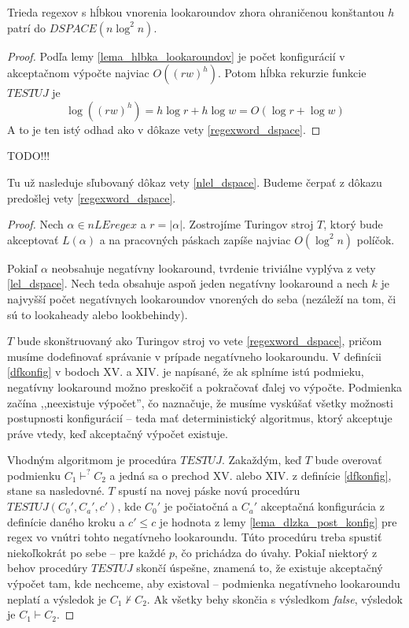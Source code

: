 \documentclass{svk_long_sk}
\def\nle{nLEregex}
\def\todo{{\color{red} TODO!!!}}
\begin{document}
\begin{corollary}
Trieda regexov s hĺbkou vnorenia look\-aroundov zhora ohraničenou konštantou $h$ patrí do $DSPACE(n\log^2 n)$.
\end{corollary}
\begin{proof}
Podľa lemy \ref{lema_hlbka_lookaroundov} je počet konfigurácií v akceptačnom výpočte najviac $O((rw)^h)$. Potom hĺbka rekurzie funkcie $TESTUJ$ je 
$$\log((rw)^h) = h\log r + h\log w = O(\log r+\log w)$$ 
A to je ten istý odhad ako v dôkaze vety \ref{regexword_dspace}.
\end{proof}
\todo

Tu už nasleduje sľubovaný dôkaz vety \ref{nlel_dspace}. Budeme čerpať z dôkazu predošlej vety \ref{regexword_dspace}.
\begin{proof}
Nech $\alpha\in\nle$ a $r=|\alpha|$. Zostrojíme Turingov stroj $T$, ktorý bude akceptovať $L(\alpha)$ a na pracovných páskach zapíše najviac $O(\log^2 n)$ políčok.

Pokiaľ $\alpha$ neobsahuje negatívny lookaround, tvrdenie triviálne vyplýva z vety \ref{lel_dspace}. Nech teda obsahuje aspoň jeden negatívny lookaround a nech $k$ je najvyšší počet negatívnych lookaroundov vnorených do seba (nezáleží na tom, či sú to lookaheady alebo look\-behindy).

$T$ bude skonštruovaný ako Turingov stroj vo vete \ref{regexword_dspace}, pričom musíme dodefinovať správanie v prípade negatívneho lookaroundu. V definícii \ref{dfkonfig} v bodoch XV. a XIV. je napísané, že ak splníme istú podmieku, negatívny lookaround možno preskočiť a pokračovať ďalej vo výpočte. Podmienka začína ,,neexistuje výpočet'', čo naznačuje, že musíme vyskúšať všetky možnosti postupnosti konfigurácií -- teda mať deterministický algoritmus, ktorý akceptuje práve vtedy, keď akceptačný výpočet existuje.

Vhodným algoritmom je procedúra $TESTUJ$. Zakaždým, keď $T$ bude overovať podmienku $C_1\mathop{\vdash}^? C_2$ a jedná sa o prechod XV. alebo XIV. z definície \ref{dfkonfig}, stane sa nasledovné. $T$ spustí na novej páske novú procedúru $TESTUJ(C_0',C_a',c')$, kde $C_0'$ je počiatočná a $C_a'$ akceptačná konfigurácia z definície daného kroku a $c' \leq c$ je hodnota z lemy \ref{lema_dlzka_post_konfig} pre regex vo vnútri tohto negatívneho lookaroundu. Túto procedúru treba spustiť niekoľkokrát po sebe -- pre každé $p$, čo prichádza do úvahy. Pokiaľ niektorý z behov procedúry $TESTUJ$ skončí úspešne, znamená to, že existuje akceptačný výpočet tam, kde nechceme, aby existoval -- podmienka negatívneho lookaroundu neplatí a výsledok je $C_1\nvdash C_2$. Ak všetky behy skončia s výsledkom \textit{false}, výsledok je $C_1\vdash C_2$.


\end{proof}
\end{document}
